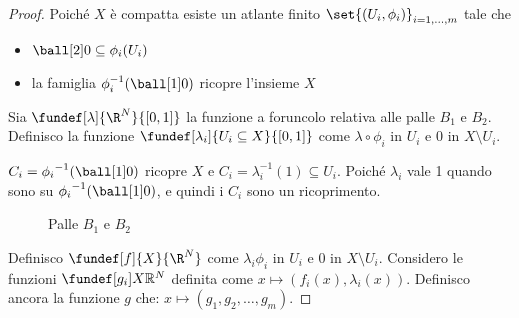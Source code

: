 \begin{proof}
 Poiché $X$ è compatta esiste un atlante finito $\set{(U_i, \phi_i)}_{i = 1, ..., m}$ tale che 
 \begin{itemize}
  \item $\ball[2]0 \subseteq {\phi}_{i}(U_{i})$
  \item la famiglia ${\phi_{i}^{-1}(\ball[1]0)}$ ricopre l'insieme $X$
  \end{itemize}
 Sia $\fundef[\lambda]{\R^N}{[0, 1]}$ la funzione a foruncolo relativa alle palle $B_{1}$ e $B_{2}$. Definisco la funzione $\fundef[\lambda_i]{U_i\subseteq X}{[0,1]}$
 come $\lambda \circ \phi_{i}$ in $U_{i}$ e $0$ in $X \setminus U_{i}$.
 
 ${C_{i}} = {\phi_{i}}^{-1} (\ball[1]0)$ ricopre $X$ e $C_{i} = {\lambda}_{i}^{-1}(1) \subseteq U_{i}$. Poiché $\lambda_i$ vale 1 quando sono su ${\phi_{i}}^{-1} (\ball[1]0)$, e quindi i $C_{i}$ sono un ricoprimento.


\begin{figure}
    \centering %
    
    \caption{Palle $B_{1}$ e $B_{2}$}
\end{figure}
 
 Definisco $\fundef[f]{X}{\R^N}$ come $\lambda_{i}  \phi_{i}$ in $U_{i}$ e $0$ in $X \setminus U_{i}$. Considero le funzioni $\fundef[g_{i}]{X}{\mathbb{R}^{N}}$
 definita come $x \mapsto (f_{i}(x), \lambda_{i}(x))$. Definisco ancora la funzione $g$ che: $x \mapsto (g_1, g_2, \dots, g_m)$.
 

\end{proof}
